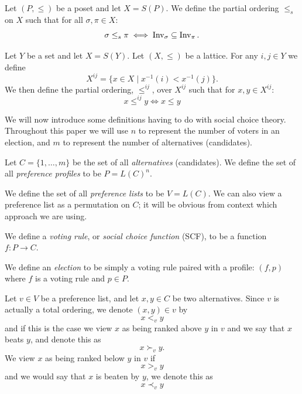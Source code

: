 	\begin{definition}[$\le_s$]
		Let $(P, \le)$ be a poset and let $X = S(P)$. We define the partial ordering $\le_s$ on $X$ such that for all $\sigma, \pi \in X$:
		\[
			\sigma \le_s \pi \iff \operatorname{Inv}_{\sigma} \subseteq \operatorname{Inv}_{\pi}.
		\]
	\end{definition}

	\begin{definition}[$X^{ij}, \le^{ij}$]
		Let $Y$ be a set and let $X = S(Y)$. Let $(X, \le)$ be a lattice. For any $i,j \in Y$ we define
		\[
			X^{ij} = \{ x \in X \mid x^{-1}(i) < x^{-1}(j) \}.
		\]
		We then define the partial ordering, $\le^{ij}$, over $X^{ij}$ such that for $x, y \in X^{ij}$:
		\[
			x \le^{ij} y \iff x \le y
		\]
	\end{definition}

	We will now introduce some definitions having to do with social choice theory. Throughout this paper we will use $n$ to represent the number of voters in an election, and $m$ to represent the number of alternatives (candidates).

	\begin{definition}
		Let $C = \{1, \ldots, m\}$ be the set of all \emph{alternatives} (candidates). We define the set of all \emph{preference profiles} to be $P = L(C)^n$.
	\end{definition}

	\begin{definition}
		We define the set of all \emph{preference lists} to be $V = L(C)$. We can also view a preference list as a permutation on $C$; it will be obvious from context which approach we are using.
	\end{definition}

	\begin{definition}
		We define a \emph{voting rule}, or \emph{social choice function} (SCF), to be a function $f : P \to C$.
	\end{definition}

	\begin{definition}
		We define an \emph{election} to be simply a voting rule paired with a profile: $(f, p)$ where $f$ is a voting rule and $p \in P$.
	\end{definition}

	\begin{definition}
		Let $v \in V$ be a preference list, and let $x, y \in C$ be two alternatives. Since $v$ is actually a total ordering, we denote $(x, y) \in v$ by
		\[
			x <_v y
		\]
		and if this is the case we view $x$ as being ranked above $y$ in $v$ and we say that $x$ beats $y$, and denote this as
		\[
			x \succ_v y.
		\]
		We view $x$ as being ranked below $y$ in $v$ if
		\[
			x >_v y
		\]
		and we would say that $x$ is beaten by $y$, we denote this as
		\[
			x \prec_v y
		\]
	\end{definition}

